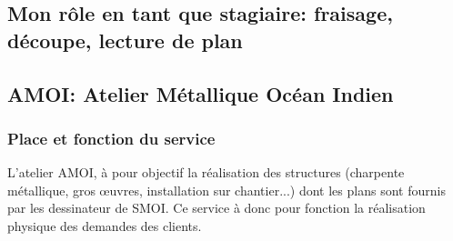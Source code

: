 \newpage
\begin{center}
    \section{Mon rôle en tant que stagiaire: fraisage, découpe, lecture de plan}
\end{center}

\subsection{AMOI: Atelier Métallique Océan Indien}

\subsubsection{Place et fonction du service}%
L'atelier AMOI, à pour objectif la réalisation des structures (charpente métallique, gros œuvres, installation sur chantier...) dont les plans sont fournis par les dessinateur de SMOI. Ce service à donc pour fonction la réalisation physique des demandes des clients.

